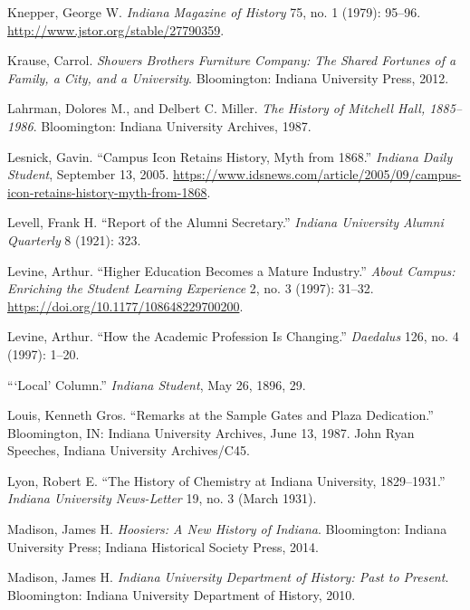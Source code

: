 \documentclass[
  american,
  letterpaper,
]{scrreprt}
\newlength{\cslhangindent}
\newenvironment{CSLReferences}[2] %
 {\begin{list}{}{%
  \setlength{\itemindent}{0pt}
  \setlength{\leftmargin}{0pt}
  \setlength{\parsep}{0pt}
  \ifodd #1
   \setlength{\leftmargin}{\cslhangindent}
   \setlength{\itemindent}{-1\cslhangindent}
  \fi
  \setlength{\itemsep}{#2\baselineskip}}}
 {\end{list}}
\begin{document}
\begin{CSLReferences}{1}{0}
Knepper, George W. \emph{Indiana Magazine of History} 75, no. 1 (1979):
95--96. \url{http://www.jstor.org/stable/27790359}.

Krause, Carrol. \emph{Showers Brothers Furniture Company: The Shared
Fortunes of a Family, a City, and a University}. Bloomington: Indiana
University Press, 2012.

Lahrman, Dolores M., and Delbert C. Miller. \emph{The History of
Mitchell Hall, 1885--1986}. Bloomington: Indiana University Archives,
1987.

Lesnick, Gavin. {``Campus Icon Retains History, Myth from 1868.''}
\emph{Indiana Daily Student}, September 13, 2005.
\url{https://www.idsnews.com/article/2005/09/campus-icon-retains-history-myth-from-1868}.

Levell, Frank H. {``Report of the Alumni Secretary.''} \emph{Indiana
University Alumni Quarterly} 8 (1921): 323.

Levine, Arthur. {``Higher Education Becomes a Mature Industry.''}
\emph{About Campus: Enriching the Student Learning Experience} 2, no. 3
(1997): 31--32. \url{https://doi.org/10.1177/108648229700200}.

Levine, Arthur. {``How the Academic Profession Is Changing.''}
\emph{Daedalus} 126, no. 4 (1997): 1--20.

{``{`Local'} Column.''} \emph{Indiana Student}, May 26, 1896, 29.

Louis, Kenneth Gros. {``Remarks at the Sample Gates and Plaza
Dedication.''} Bloomington, IN: Indiana University Archives, June 13,
1987. John Ryan Speeches, Indiana University Archives/C45.

Lyon, Robert E. {``The History of Chemistry at Indiana University,
1829--1931.''} \emph{Indiana University News-Letter} 19, no. 3 (March
1931).

Madison, James H. \emph{Hoosiers: A New History of Indiana}.
Bloomington: Indiana University Press; Indiana Historical Society Press,
2014.

Madison, James H. \emph{Indiana University Department of History: Past
to Present}. Bloomington: Indiana University Department of History,
2010.


\end{CSLReferences}
\end{document}
